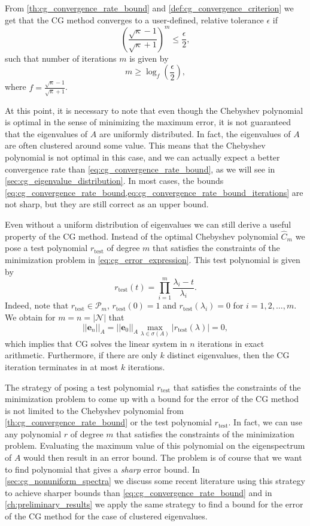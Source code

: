 From \cref{th:cg_convergence_rate_bound} and \cref{def:cg_convergence_criterion} we get that the CG method converges to a user-defined, relative tolerance $\epsilon$ if
\begin{equation*}
  \left(\frac{\sqrt{\kappa} - 1}{\sqrt{\kappa} + 1}\right)^{m} \leq \frac{\epsilon}{2},
\end{equation*}
such that number of iterations $m$ is given by
\begin{equation}
  m \geq \log_f\left(\frac{\epsilon}{2}\right),
  \label{eq:cg_convergence_rate_bound_iterations}
\end{equation}
where $f = \frac{\sqrt{\kappa} - 1}{\sqrt{\kappa} + 1}$.

At this point, it is necessary to note that even though the Chebyshev polynomial is optimal in the sense of minimizing the maximum error, it is not guaranteed that the eigenvalues of $A$ are uniformly distributed. In fact, the eigenvalues of $A$ are often clustered around some value. This means that the Chebyshev polynomial is not optimal in this case, and we can actually expect a better convergence rate than \cref{eq:cg_convergence_rate_bound}, as we will see in \cref{sec:cg_eigenvalue_distribution}. In most cases, the bounds \cref{eq:cg_convergence_rate_bound,eq:cg_convergence_rate_bound_iterations} are not sharp, but they are still correct as an upper bound.

Even without a uniform distribution of eigenvalues we can still derive a useful property of the CG method. Instead of the optimal Chebyshev polynomial $\hat{C}_m$ we pose a test polynomial $r_{\textrm{test}}$ of degree $m$ that satisfies the constraints of the minimization problem in \cref{eq:cg_error_expression}. This test polynomial is given by
\[
  r_{\textrm{test}}(t) = \prod_{i=1}^m \frac{\lambda_i - t}{\lambda_i}.
\]
Indeed, note that $r_{\textrm{test}}\in\mathcal{P}_m$, $r_{\textrm{test}}(0) = 1$ and $r_{\textrm{test}}(\lambda_i) = 0$ for $i = 1, 2, \dots, m$. We obtain for $m = n = |\mathcal{N}|$ that
\[
  ||\mathbf{e}_n||_A = ||\mathbf{e}_0||_A \max_{\lambda \in \sigma(A)} |r_{\textrm{test}}(\lambda)| = 0,
\]
which implies that CG solves the linear system in $n$ iterations in exact arithmetic. Furthermore, if there are only $k$ distinct eigenvalues, then the CG iteration terminates in at most $k$ iterations.

The strategy of posing a test polynomial $r_{\textrm{test}}$ that satisfies the constraints of the minimization problem to come up with a bound for the error of the CG method is not limited to the Chebyshev polynomial from \cref{th:cg_convergence_rate_bound} or the test polynomial $r_{\textrm{test}}$. In fact, we can use any polynomial $r$ of degree $m$ that satisfies the constraints of the minimization problem. Evaluating the maximum value of this polynomial on the eigenspectrum of $A$ would then result in an error bound. The problem is of course that we want to find polynomial that gives a \textit{sharp} error bound. In \cref{sec:cg_nonuniform_spectra} we discuss some recent literature using this strategy to achieve sharper bounds than \cref{eq:cg_convergence_rate_bound} and in \cref{ch:preliminary_results} we apply the same strategy to find a bound for the error of the CG method for the case of clustered eigenvalues.

